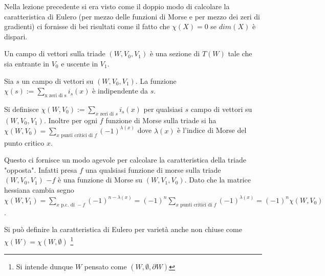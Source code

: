 Nella lezione precedente si era visto come il doppio modo di calcolare la caratteristica di Eulero (per mezzo delle funzioni di Morse e per mezzo dei zeri di gradienti) ci fornisse di bei risultati come il fatto che $\chi(X)=0$ se $dim(X)$ è dispari.\\

\begin{defn}
Un campo di vettori sulla triade $(W, V_0, V_1)$ è una sezione di $T(W)$ tale che sia entrante in $V_0$ e uscente in $V_1$.
\end{defn}
\begin{teo}
Sia $s$ un campo di vettori su $(W, V_0, V_1)$. La funzione $\chi(s):=\sum_{\text{x zeri di s}} i_s(x)$ è indipendente da $s$.
\end{teo}
\begin{defn}
Si definisce $\chi(W, V_0):=\sum_{x\text{ zeri di }s} i_s(x)$ per qualsiasi $s$ campo di vettori su $(W, V_0, V_1)$. Inoltre per ogni $f$ funzione di Morse sulla triade si ha $\chi(W, V_0)=\sum_{x\text{ punti critici di }f} (-1)^{\lambda(x)}$ dove $\lambda(x)$ è l'indice di Morse del punto critico $x$.
\end{defn}
\begin{oss}
Questo ci fornisce un modo agevole per calcolare la caratteristica della triade "opposta". Infatti presa $f$ una qualsiasi funzione di morse sulla triade $(W, V_0, V_1)$ $-f$ è una funzione di Morse su $(W, V_1, V_0)$. Dato che la matrice hessiana cambia segno $\chi(W, V_1)=\sum_{x\text{ p.c. di }-f} (-1)^{n-\lambda(x)}=(-1)^n\sum_{x\text{ punti critici di }f}(-1)^{\lambda(x)}=(-1)^n\chi(W, V_0)$.  
\end{oss}

\begin{defn}
Si può definire la caratteristica di Eulero per varietà anche non chiuse come $\chi(W)=\chi(W, \emptyset)$
\footnote{Si intende dunque $W$ pensato come $(W,\emptyset, \partial W)$}
\end{defn}

